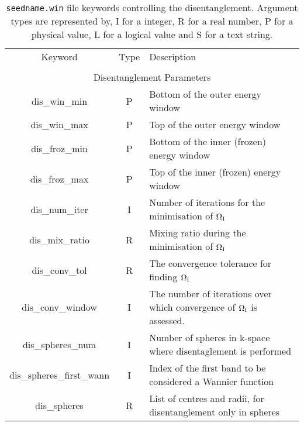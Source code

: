 \begin{table}
\begin{center}
\begin{tabular}{|c|c|p{6cm}|}
\hline
Keyword & Type & Description \\
        &      &             \\
\hline\hline
\multicolumn{3}{|c|}{Disentanglement Parameters} \\
\hline
{\sc dis\_win\_min }   & P & Bottom of the outer energy window \\
{\sc dis\_win\_max }   & P & Top of the outer energy window \\
{\sc dis\_froz\_min }   & P & Bottom of the inner (frozen) energy window \\
{\sc dis\_froz\_max }   & P & Top of the inner (frozen) energy window \\
{\sc dis\_num\_iter }   & I & Number of iterations for the minimisation
of $\Omega_{\mathrm{I}}$ \\
{\sc dis\_mix\_ratio }   & R & Mixing ratio during the minimisation of $\Omega_{\mathrm{I}}$\\
{\sc dis\_conv\_tol }   & R & The convergence tolerance for finding $\Omega_{\mathrm{I}}$ \\
{\sc dis\_conv\_window }   & I & The number of iterations over which
convergence of $\Omega_{\mathrm{I}}$ is assessed. \\
{\sc dis\_spheres\_num }   & I & Number of spheres in k-space where disentaglement is performed\\
{\sc dis\_spheres\_first\_wann }   & I & Index of the first band to be considered a Wannier function \\
{\sc dis\_spheres } & R & List of centres and radii, for disentanglement only in spheres \\
\hline
\end{tabular}
\caption[Parameter file keywords controlling disentanglement parameters.]
{{\tt seedname.win} file keywords controlling the disentanglement.
  Argument types
are represented by, I for a integer, R for a real number, P for a
physical value, L for a logical value and S for a text string.}
\label{parameter_keywords4}
\end{center}
\end{table}



